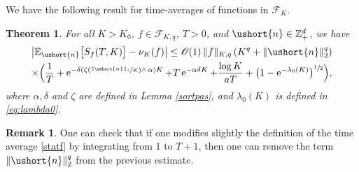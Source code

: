\documentclass[11pt]{article}
\newcommand{\Psfrac}[2]{(\sfrac{#1}{#2})}
\newcommand{\scaleto}[2]{#1}
\let\mathcal\mathscr
\numberwithin{equation}{section}
\theoremstyle{plain}
\newtheorem{theorem}{Theorem}[section]
\theoremstyle{definition}
\newtheorem{remark}{Remark}[section]
\newcommand{\E}{{\mathbb{E}}}
\newcommand{\zentiers}{{\mathbb{Z}}}
\newcommand{\domaine}{\zentiers_{+}^{d}}
\newcommand{\Oun}{\mathcal{O}(1)}
\newcommand{\sK}{K}
\newcommand{\vecn}{\ushort{n}}
\newcommand{\nuk}{\nu_{K}}\let\snuk\nuk
\newcommand{\e}{\operatorname{e}}
\newcommand{\normdeux}[1]{\|#1\|_{2}}\let\snormdeux\normdeux
\begin{document}
We have the following result for time-averages of functions in $\mathscr{F}\!_{\sK}$.
\begin{theorem}\label{pseudoergod}
For all $K>K_0$, $f\in\mathscr{F}\!_{\sK,q}$, $T>0$, and $\vecn\in \domaine$, we have
\begin{multline*}
\left|\E_{\vecn}\bigl[S_{f}(T,K)\bigr]-\nuk(f)\right|
\leq \Oun\, \|f\|_{\sK,q}\,(K^{q}+\normdeux{\vecn}^{\scaleto{q}{3.6pt}})\\
\times \Bigl(\frac{1}{T} + \e^{-\delta\left(\zeta\Psfrac{\|\vecn\|_{1}}{K}\wedge\,\alpha\right)K}
+T\e^{-\alpha\delta K}+\frac{\log K}{a T}+ \bigl(1-\e^{-\lambda_0(K)}\bigr)^{\sfrac{1}{2}} \Bigr),
\end{multline*}
where $\alpha, \delta$ and $\zeta$ are defined in Lemma \ref{sortpas}, and $\lambda_0(K)$ is defined in \eqref{eq:lambda0}.
\end{theorem}
\begin{remark}
One can check that if one modifies slightly the definition of the time average \eqref{statf} by integrating from $1$ to $T+1$,
then one can remove the term $\normdeux{\vecn}^{q}$ from the previous estimate.
\end{remark}
\end{document}
